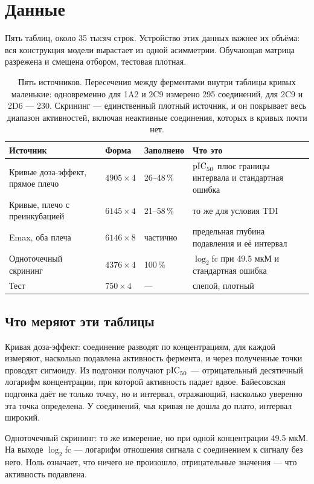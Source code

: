 \section{Данные}
\label{sec:data}

Пять таблиц, около 35 тысяч строк. Устройство этих данных важнее их объёма: вся конструкция модели вырастает из одной асимметрии.
Обучающая матрица разрежена и смещена отбором, тестовая плотная.

\begin{table}[htbp]\centering\small
\begin{tabularx}{\textwidth}{@{}Xllp{62mm}@{}}
\toprule
Источник & Форма & Заполнено & Что это \\
\midrule
Кривые доза-эффект, прямое плечо & $4905\times 4$ & 26--48\,\% & $\mathrm{pIC}_{50}$ плюс границы интервала и стандартная ошибка \\
Кривые, плечо с преинкубацией & $6145\times 4$ & 21--58\,\% & то же для условия TDI \\
Emax, оба плеча & $6146\times 8$ & частично & предельная глубина подавления и её интервал \\
Одноточечный скрининг & $4376\times 4$ & 100\,\% & $\log_2$fc при 49.5 мкМ и стандартная ошибка \\
Тест & $750\times 4$ & --- & слепой, плотный \\
\bottomrule
\end{tabularx}
\caption{Пять источников. Пересечения между ферментами внутри таблицы кривых маленькие: одновременно
для 1A2 и 2C9 измерено 295 соединений, для 2C9 и 2D6 --- 230. Скрининг --- единственный плотный
источник, и он покрывает весь диапазон активностей, включая неактивные соединения, которых в кривых
почти нет.}
\end{table}

\subsection{Что меряют эти таблицы}

Кривая доза-эффект: соединение разводят по концентрациям, для каждой измеряют, насколько подавлена
активность фермента, и через полученные точки проводят сигмоиду. Из подгонки получают $\mathrm{pIC}_{50}$ ---
отрицательный десятичный логарифм концентрации, при которой активность падает вдвое. Байесовская подгонка
даёт не только точку, но и интервал, отражающий, насколько уверенно эта точка определена. У соединений,
чья кривая не дошла до плато, интервал широкий.

Одноточечный скрининг: то же измерение, но при одной концентрации 49.5 мкМ. На выходе $\log_2$fc ---
логарифм отношения сигнала с соединением к сигналу без него. Ноль означает, что ничего не произошло,
отрицательные значения --- что активность подавлена.

